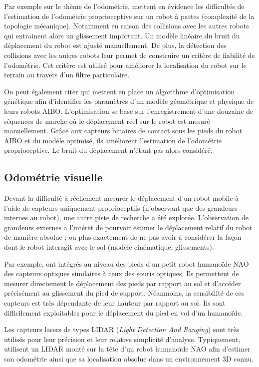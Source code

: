 Par exemple sur le thème de l'odométrie, \cite{hoffmann_exploiting_2005} mettent 
en évidence les difficultés de l'estimation de l'odométrie proprioceptive 
sur un robot à pattes (complexité de la topologie mécanique). 
Notamment en raison des collisions avec les autres robots qui entrainent alors
un glissement important.
Un modèle linéaire du bruit du déplacement du robot est ajusté manuellement.
De plus, la détection des collisions avec les autres robots leur permet
de construire un critère de \og fiabilité \fg de l'odométrie.
Cet critère est utilisé pour améliorer la localisation du robot sur le terrain 
au travers d'un filtre particulaire.

On peut également citer \cite{he_model-based_2007} qui mettent en place
un algorithme d'optimisation génétique afin d'identifier les paramètres
d'un modèle géométrique et physique de leurs robots AIBO.
L'optimisation se base sur l'enregistrement d'une douzaine de séquences
de marche où le déplacement réel sur le robot est mesuré manuellement.
Grâce aux capteurs binaires de contact sous les pieds du robot AIBO et 
du modèle optimisé, ils améliorent l'estimation de l'odométrie proprioceptive.
Le bruit du déplacement n'étant pas alors considéré.

\subsection{Odométrie visuelle}

Devant la difficulté à réellement mesurer le déplacement
d'un robot mobile à l'aide de capteurs uniquement \og proprioceptifs \fg
(n'observant que des grandeurs internes au robot), 
une autre piste de recherche a été explorée.
L'observation de grandeurs externes a l'intérêt de pourvoir estimer 
le déplacement relatif du robot de manière \og absolue \fg ; ou plus
exactement de ne pas avoir à considérer la façon dont le robot interagit
avec le sol (modèle cinématique, glissements).

Par exemple, \cite{czarnetzki_odometry_2010} ont intégrés au niveau des pieds 
d'un petit robot humanoïde NAO des capteurs optiques similaires 
à ceux des souris optiques. 
Ils permettent de mesurer directement le déplacement des pieds par 
rapport au sol et d'accéder précisément au glissement du pied de support. 
Néanmoins, la sensibilité de ces capteurs est très dépendante de leur hauteur
par rapport au sol. Ils sont difficilement exploitables pour 
le déplacement du pied en vol d'un humanoïde.

Les capteurs lasers de types LIDAR (\textit{Light Detection And Ranging}) 
sont très utilisés pour leur précision et leur relative simplicité d'analyse. 
Typiquement, \cite{hornung_humanoid_2010} utilisent un LIDAR monté 
sur la tête d'un robot humanoïde NAO afin d'estimer son odométrie ainsi que
sa localisation absolue dans un environnement 3D connu.

